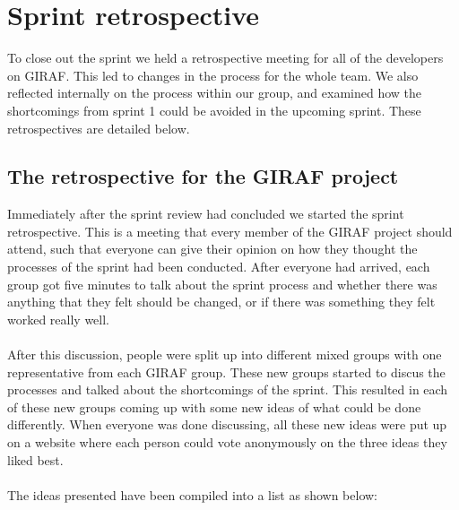 \section{Sprint retrospective}
To close out the sprint we held a retrospective meeting for all of the developers on GIRAF.
This led to changes in the process for the whole team.
We also reflected internally on the process within our group, and examined how the shortcomings from sprint 1 could be avoided in the upcoming sprint.
These retrospectives are detailed below.

\subsection{The retrospective for the GIRAF project}\label{retro1giraf}
Immediately after the sprint review had concluded we started the sprint retrospective.
This is a meeting that every member of the GIRAF project should attend, such that everyone can give their opinion on how they thought the processes of the sprint had been conducted.
After everyone had arrived, each group got five minutes to talk about the sprint process and whether there was anything that they felt should be changed, or if there was something they felt worked really well.
\\\\
After this discussion, people were split up into different mixed groups with one representative from each GIRAF group.
These new groups started to discus the processes and talked about the shortcomings of the sprint.
This resulted in each of these new groups coming up with some new ideas of what could be done differently.
When everyone was done discussing, all these new ideas were put up on a website where each person could vote anonymously on the three ideas they liked best.
\\\\
The ideas presented have been compiled into a list as shown below:
